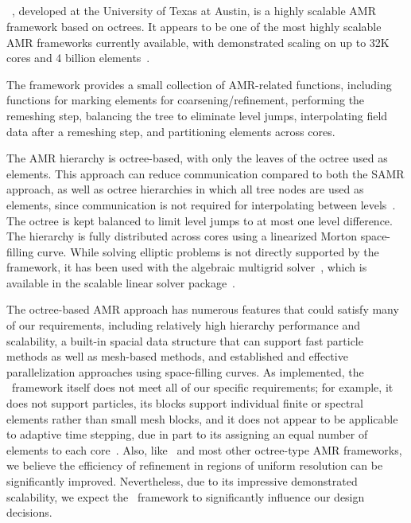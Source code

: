 \documentclass[10pt,twocolumn]{article}
\begin{document}
\subsection{\alps } \label{ss:alps}

\alps~\cite{BuBu09}, developed at the University of Texas at Austin,
is a highly scalable AMR framework based on octrees.  It appears to be
one of the most highly scalable AMR frameworks currently available,
with demonstrated scaling on up to 32K cores and 4 billion
elements~\cite{BuGh08}.

The framework provides a small collection of AMR-related functions,
including functions for marking elements for coarsening/refinement,
performing the remeshing step, balancing the tree to eliminate level
jumps, interpolating field data after a remeshing step, and
partitioning elements across cores.

The AMR hierarchy is octree-based, with only the leaves of the octree
used as elements.  This approach can reduce communication compared to
both the SAMR approach, as well as octree hierarchies in which all
tree nodes are used as elements, since communication is not required
for interpolating between levels~\cite{BuGh08b}.  The octree is kept
balanced to limit level jumps to at most one level difference.  The
hierarchy is fully distributed across cores using a linearized Morton
space-filling curve.  While solving elliptic problems is not directly
supported by the framework, it has been used with the 
algebraic multigrid solver~\cite{HeYa02}, which is available in the
 scalable linear solver package~\cite{FaJo06}.

The octree-based AMR approach has numerous features that could satisfy
many of our requirements, including relatively high hierarchy
performance and scalability, a built-in spacial data structure that
can support fast particle methods as well as mesh-based methods, and
established and effective parallelization approaches using
space-filling curves.  As implemented, the \alps\ framework itself
does not meet all of our specific requirements; for example, it does
not support particles, its blocks support individual finite or
spectral elements rather than small mesh blocks, and it does not
appear to be applicable to adaptive time stepping, due in part to its
assigning an equal number of elements to each core~\cite{BuGh08b}.
Also, like \paramesh\ and most other octree-type AMR frameworks, we
believe the efficiency of refinement in regions of uniform resolution
can be significantly improved.  Nevertheless, due to its impressive
demonstrated scalability, we expect the \alps\ framework to
significantly influence our design decisions.
\end{document}
